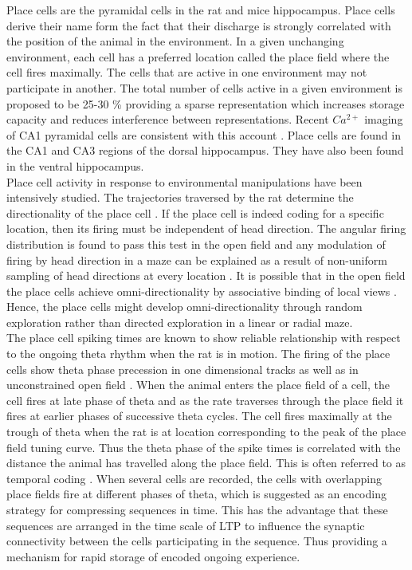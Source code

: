 Place cells are the  pyramidal cells in the rat and mice hippocampus. Place cells derive their name form the fact that their discharge is strongly correlated with the position of the animal in the environment. In a given unchanging environment, each cell has a preferred location called the place field where the cell fires maximally.  The cells that are active in one environment may not participate in another. The total number of cells active in a given environment is proposed to be 25-30 \% providing a sparse representation which increases storage capacity and reduces interference between representations\cite{Marr2007, Wilson1993}. Recent $Ca^{2+}$ imaging of CA1 pyramidal cells are consistent with this account \cite{Ziv2013}.
Place cells are found in the CA1 and CA3 regions of the dorsal hippocampus. They have also been found in the ventral hippocampus.\\
Place cell activity in response to environmental manipulations have been intensively studied. The trajectories traversed by the rat determine the directionality of the place cell \cite{Save1998}. If the place cell is indeed coding for a specific location, then its firing must be independent of  head direction. The angular firing distribution is found to pass this test in the open field and any modulation of firing by head direction in a maze can be explained as a result of non-uniform sampling of head directions at every location \cite{Muller1994}. It is possible that in the open field the place cells achieve omni-directionality by associative binding of local views \cite{Sharp1991}. Hence, the place cells might develop omni-directionality through random exploration rather than directed exploration in a linear or radial maze.\\
The place cell spiking times are known to show reliable relationship with respect to the ongoing theta rhythm when the rat is in motion. The firing of the place cells show theta phase precession in one dimensional tracks \cite{O'Keefe1993} as well as in unconstrained open field \cite{Skaggs1996c}. When the animal enters the place field of a cell, the cell fires at late phase of theta and as the rate traverses through the place field it fires at earlier phases of successive theta cycles. The cell fires maximally at the trough of theta when the rat is at location corresponding to the peak of the place field tuning curve. Thus the theta phase of the spike times is correlated with the distance the animal has travelled along the place field. This is often referred to as temporal coding \cite{Huxter2003}. When several cells are recorded, the cells with overlapping place fields fire at different phases of theta, which is suggested as an encoding strategy for compressing sequences in time. This has the advantage that these sequences are arranged in the time scale of LTP to influence the synaptic connectivity between the cells participating in the sequence. Thus providing a mechanism for rapid storage of encoded ongoing experience. \\
